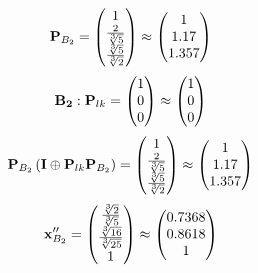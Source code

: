 \documentclass[10pt,a4paper]{article}
\begin{document}
	\[
		\bold{P}_{B_2} = 
		\begin{pmatrix}
			{1} {} \\
			\frac{{2}} {\sqrt[3]{5}} \\
			\frac{\sqrt[3]{5}} {\sqrt[3]{2}} \\
		\end{pmatrix}
		\approx
		\begin{pmatrix}
			1        \\
			1.17     \\
			1.357    \\
		\end{pmatrix}
	\]
	\[
		\bold{B_2}: \bold{P}_{lk} = 
		\begin{pmatrix}
			{1} {} \\
			{{0}} {} \\
			{{0}} {} \\
		\end{pmatrix}
		\approx
		\begin{pmatrix}
			1        \\
			0        \\
			0        \\
		\end{pmatrix}
	\]
	\[
		\bold{P}_{B_2}\left(\bold{I} \oplus \bold{P}_{lk}\bold{P}_{B_2}\right) = 
		\begin{pmatrix}
			{1} {} \\
			\frac{{2}} {\sqrt[3]{5}} \\
			\frac{\sqrt[3]{5}} {\sqrt[3]{2}} \\
		\end{pmatrix}
		\approx
		\begin{pmatrix}
			1        \\
			1.17     \\
			1.357    \\
		\end{pmatrix}
	\]
	\[
		\bold{x}''_{B_2} = 
		\begin{pmatrix}
			\frac{\sqrt[3]{2}} {\sqrt[3]{5}} \\
			\frac{\sqrt[3]{16}} {\sqrt[3]{25}} \\
			{1} {} \\
		\end{pmatrix}
		\approx
		\begin{pmatrix}
			0.7368   \\
			0.8618   \\
			1        \\
		\end{pmatrix}
	\]

\end{document}
